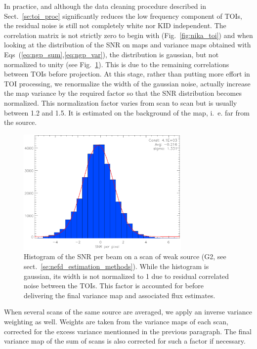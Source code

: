 In practice, and although the data cleaning procedure described in
Sect.~\ref{se:toi_proc} significantly reduces the low frequency component of
TOIs, the residual noise is still not completely white nor KID independent. The
correlation matrix is not strictly zero to begin with (Fig.~\ref{fig:nika_toi})
and when looking at the distribution of the SNR on maps and variance maps
obtained with Eqs~(\ref{eq:ngp_sum},\ref{eq:ngp_var}), the distribution is
gaussian, but not normalized to unity (see Fig.~\ref{fig:sigma_boost}). This is
due to the remaining correlations between TOIs before projection. At this stage,
rather than putting more effort in TOI processing, we renormalize the width of
the gaussian noise, actually increase the map variance by the required factor
so that the SNR distribution becomes normalized. This normalization factor
varies from scan to scan but is usually between 1.2 and 1.5. It is estimated on
the background of the map, i.~e. far from the source.

\begin{figure}[ht!]
\begin{center}
\includegraphics[clip, angle=0, scale=1, width=0.75\textwidth]{Figures/sigma_boost.eps}
\caption[Distribution of the SNR per beam]{Histogram of the SNR per beam on a scan of weak source (G2, see
  sect.~\ref{se:nefd_estimation_methods}). While the histogram is gaussian, its
  width is not normalized to 1 due to residual correlated noise between the
  TOIs. This factor is accounted for before delivering the final variance map
  and associated flux estimates.}
\label{fig:sigma_boost}
\end{center}
\end{figure}

When several scans of the same source are averaged, we apply an inverse
variance weighting as well. Weights are taken from the variance maps of each scan,
corrected for the excess variance mentionned in the previous paragraph. The
final variance map of the sum of scans is also corrected for such a factor if necessary.

